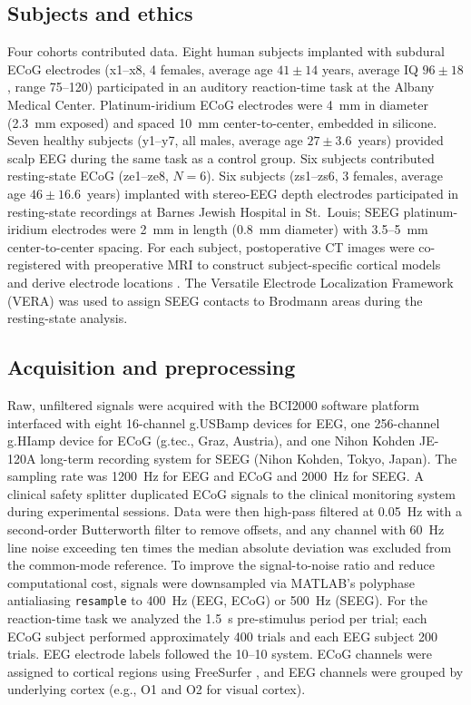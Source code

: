 \documentclass[11pt]{article}
\begin{document}
\subsection{Subjects and ethics}

Four cohorts contributed data. Eight human subjects implanted with subdural ECoG electrodes (x1--x8, 4 females, average age $41 \pm 14$ years, average IQ $96 \pm 18$, range 75--120) participated in an auditory reaction-time task at the Albany Medical Center. Platinum-iridium ECoG electrodes were 4~mm in diameter (2.3~mm exposed) and spaced 10~mm center-to-center, embedded in silicone. Seven healthy subjects (y1--y7, all males, average age $27 \pm 3.6$~years) provided scalp EEG during the same task as a control group. Six subjects contributed resting-state ECoG (ze1--ze8, $N=6$). Six subjects (zs1--zs6, 3 females, average age $46 \pm 16.6$~years) implanted with stereo-EEG depth electrodes participated in resting-state recordings at Barnes Jewish Hospital in St.~Louis; SEEG platinum-iridium electrodes were 2~mm in length (0.8~mm diameter) with 3.5--5~mm center-to-center spacing. For each subject, postoperative CT images were co-registered with preoperative MRI to construct subject-specific cortical models and derive electrode locations \citep{coon2016method}. The Versatile Electrode Localization Framework (VERA) was used to assign SEEG contacts to Brodmann areas during the resting-state analysis.

\subsection{Acquisition and preprocessing}

Raw, unfiltered signals were acquired with the BCI2000 software platform \citep{schalk2004bci2000} interfaced with eight 16-channel g.USBamp devices for EEG, one 256-channel g.HIamp device for ECoG (g.tec., Graz, Austria), and one Nihon Kohden JE-120A long-term recording system for SEEG (Nihon Kohden, Tokyo, Japan). The sampling rate was 1200~Hz for EEG and ECoG and 2000~Hz for SEEG. A clinical safety splitter duplicated ECoG signals to the clinical monitoring system during experimental sessions. Data were then high-pass filtered at 0.05~Hz with a second-order Butterworth filter to remove offsets, and any channel with 60~Hz line noise exceeding ten times the median absolute deviation was excluded from the common-mode reference. To improve the signal-to-noise ratio and reduce computational cost, signals were downsampled via MATLAB's polyphase antialiasing \texttt{resample} to 400~Hz (EEG, ECoG) or 500~Hz (SEEG). For the reaction-time task we analyzed the 1.5~s pre-stimulus period per trial; each ECoG subject performed approximately 400 trials and each EEG subject 200 trials. EEG electrode labels followed the 10--10 system. ECoG channels were assigned to cortical regions using FreeSurfer \citep{fischl2012freesurfer}, and EEG channels were grouped by underlying cortex (e.g., O1 and O2 for visual cortex).
\end{document}
